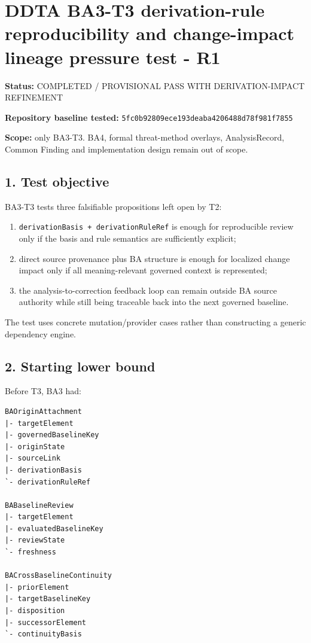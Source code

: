\documentclass[11pt,a4paper]{article}
\providecommand{\tightlist}{\setlength{\itemsep}{0pt}\setlength{\parskip}{0pt}}
\begin{document}
\section{DDTA BA3-T3 derivation-rule reproducibility and change-impact
lineage pressure test -
R1}\label{ddta-ba3-t3-derivation-rule-reproducibility-and-change-impact-lineage-pressure-test---r1}

\textbf{Status:} COMPLETED / PROVISIONAL PASS WITH DERIVATION-IMPACT
REFINEMENT

\textbf{Repository baseline tested:}
\texttt{5fc0b92809ece193deaba4206488d78f981f7855}

\textbf{Scope:} only BA3-T3. BA4, formal threat-method overlays,
AnalysisRecord, Common Finding and implementation design remain out of
scope.

\subsection{1. Test objective}\label{test-objective}

BA3-T3 tests three falsifiable propositions left open by T2:

\begin{enumerate}
\def\labelenumi{\arabic{enumi}.}
\tightlist
\item
  \texttt{derivationBasis\ +\ derivationRuleRef} is enough for
  reproducible review only if the basis and rule semantics are
  sufficiently explicit;
\item
  direct source provenance plus BA structure is enough for localized
  change impact only if all meaning-relevant governed context is
  represented;
\item
  the analysis-to-correction feedback loop can remain outside BA source
  authority while still being traceable back into the next governed
  baseline.
\end{enumerate}

The test uses concrete mutation/provider cases rather than constructing
a generic dependency engine.

\subsection{2. Starting lower bound}\label{starting-lower-bound}

Before T3, BA3 had:

\begin{verbatim}
BAOriginAttachment
|- targetElement
|- governedBaselineKey
|- originState
|- sourceLink
|- derivationBasis
`- derivationRuleRef

BABaselineReview
|- targetElement
|- evaluatedBaselineKey
|- reviewState
`- freshness

BACrossBaselineContinuity
|- priorElement
|- targetBaselineKey
|- disposition
|- successorElement
`- continuityBasis
\end{verbatim}
\end{document}
